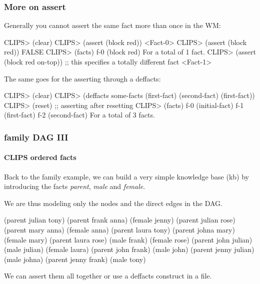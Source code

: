 \documentclass[xcolor={usenames,dvipsnames,svgnames}, compress]{beamer}
\begin{document}
\begin{frame}[fragile]
  \frametitle{More on assert}
  Generally you cannot assert the same fact more than once in the WM:
  \begin{clips-code}
    CLIPS> (clear)
    CLIPS> (assert (block red))
    <Fact-0>
    CLIPS> (assert (block red))
    FALSE
    CLIPS> (facts)
    f-0     (block red)
    For a total of 1 fact.
    CLIPS> (assert (block red on-top)) ;; this specifies a totally different fact
    <Fact-1>
  \end{clips-code}
  The same goes for the asserting through a \textsf{deffacts}:
  \begin{clips-code}
    CLIPS> (clear)
    CLIPS> (deffacts some-facts (first-fact) (second-fact) (first-fact))
    CLIPS> (reset) ;; asserting after resetting
    CLIPS> (facts)
    f-0     (initial-fact)
    f-1     (first-fact)
    f-2     (second-fact)
    For a total of 3 facts.
  \end{clips-code}
\end{frame}

\begin{frame}[fragile]
  \frametitle{family DAG III}
  \framesubtitle{CLIPS ordered facts}
  Back to the family example, we can build a very simple knowledge base (kb) by introducing the facts
  \emph{parent}, \emph{male} and \emph{female}.\par\bigskip
  We are thus modeling only the nodes and the direct edges in the DAG.
  \begin{minipage}[t]{1.0\linewidth}
    \begin{clips-code}[numbers=none]
      (parent julian tony)   (parent frank anna)   (female jenny) 
      (parent julian rose)   (parent mary anna)    (female anna)  
      (parent laura tony)    (parent johna mary)   (female mary)  
      (parent laura rose)    (male frank)          (female rose)    
      (parent john julian)   (male julian)         (female laura)                     
      (parent john frank)    (male john)             
      (parent jenny julian)  (male johna) 
      (parent jenny frank)   (male tony)
    \end{clips-code}
  \end{minipage}\bigskip
  
  We can assert them all together or use a \textsf{deffacts} construct
  in a file.
  
\end{frame}
\end{document}
